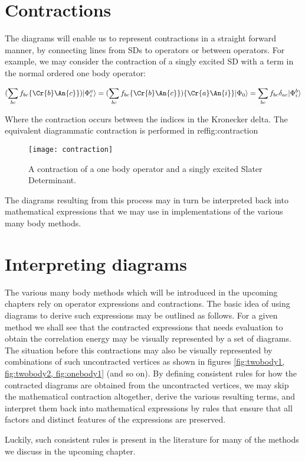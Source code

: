 \section{Contractions}

The diagrams will enable us to represent contractions in a straight forward manner, by connecting lines from SDs to operators or between operators. For example, we may consider the contraction of a singly excited SD with a term in the normal ordered one body operator:

\begin{equation}
( \sum_{bc} f_{bc} \{  \Cr{b} \An{c} \}) \vert \Phi_i^a \rangle = ( \sum_{bc} f_{bc} \{ \Cr{b} \An{c} \})\{ \Cr{a} \An{i} \} \vert \Phi_0 \rangle = \sum_{bc} f_{bc} \delta_{ac}  \vert \Phi_i^b \rangle 
\label{eqn:onebody_N1}
\end{equation}

Where the contraction occurs between the indices in the Kronecker delta. The equivalent diagrammatic contraction is performed in ref{fig:contraction}

\begin{figure}[p]
    \centering
    \texttt{[image: contraction]}
    \caption{A contraction of a one body operator and a singly excited Slater Determinant.}
    \label{fig:contraction}
\end{figure}

The diagrams resulting from this process may in turn be interpreted back into mathematical expressions that we may use in implementations of the various many body methods. 

\section{Interpreting diagrams}

The various many body methods which will be introduced in the upcoming chapters rely on operator expressions and contractions. The basic idea of using diagrams to derive such expressions may be outlined as follows. For a given method we shall see that the contracted expressions that needs evaluation to obtain the correlation energy may be visually represented by a set of diagrams. The situation before this contractions may also be visually represented by combinations of such uncontracted vertices as shown in figures \ref{fig:twobody1, fig:twobody2, fig:onebody1} (and so on). By defining consistent rules for how the contracted diagrams are obtained from the uncontracted vertices, we may skip the mathematical contraction altogether, derive the various resulting terms, and interpret them back into mathematical expressions by rules that ensure that all factors and distinct features of the expressions are preserved.

Luckily, such consistent rules is present in the literature \cite{ShavittBartlett2009} for many of the methods we discuss in the upcoming chapter.